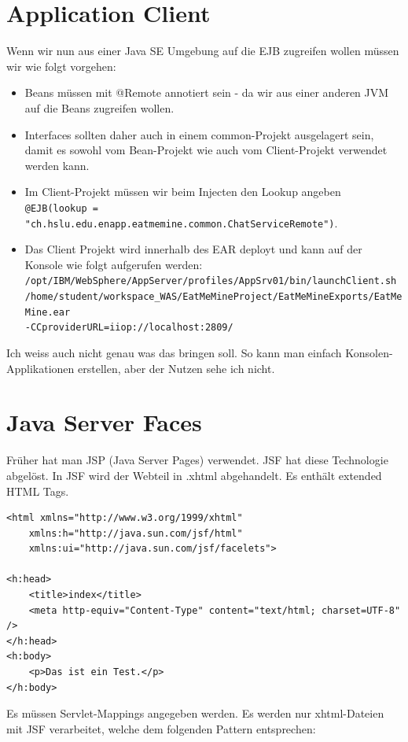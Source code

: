 \section{Application Client}
Wenn wir nun aus einer Java SE Umgebung auf die EJB zugreifen wollen müssen wir wie folgt vorgehen:
\begin{itemize}
	\item Beans müssen mit @Remote annotiert sein - da wir aus einer anderen JVM auf die Beans zugreifen wollen.
	\item Interfaces sollten daher auch in einem common-Projekt ausgelagert sein, damit es sowohl vom Bean-Projekt wie auch vom Client-Projekt verwendet werden kann.
	\item Im Client-Projekt müssen wir beim Injecten den Lookup angeben \\ \verb|@EJB(lookup = "ch.hslu.edu.enapp.eatmemine.common.ChatServiceRemote")|.
	\item Das Client Projekt wird innerhalb des EAR deployt und kann auf der Konsole wie folgt aufgerufen werden:
	\verb|/opt/IBM/WebSphere/AppServer/profiles/AppSrv01/bin/launchClient.sh|\\
	\verb|/home/student/workspace_WAS/EatMeMineProject/EatMeMineExports/EatMeMine.ear|\\
	\verb|-CCproviderURL=iiop://localhost:2809/|
\end{itemize}

Ich weiss auch nicht genau was das bringen soll. So kann man einfach Konsolen-Applikationen erstellen, aber der Nutzen sehe ich nicht.

\section{Java Server Faces}
Früher hat man JSP (Java Server Pages) verwendet. JSF hat diese Technologie abgelöst. In JSF wird der Webteil in .xhtml abgehandelt. Es enthält extended HTML Tags. 

\begin{lstlisting}
<html xmlns="http://www.w3.org/1999/xhtml"
	xmlns:h="http://java.sun.com/jsf/html"
	xmlns:ui="http://java.sun.com/jsf/facelets">

<h:head>
	<title>index</title>
	<meta http-equiv="Content-Type" content="text/html; charset=UTF-8" />
</h:head>
<h:body>
	<p>Das ist ein Test.</p>
</h:body>
\end{lstlisting}

Es müssen Servlet-Mappings angegeben werden. Es werden nur xhtml-Dateien mit JSF verarbeitet, welche dem folgenden Pattern entsprechen:

